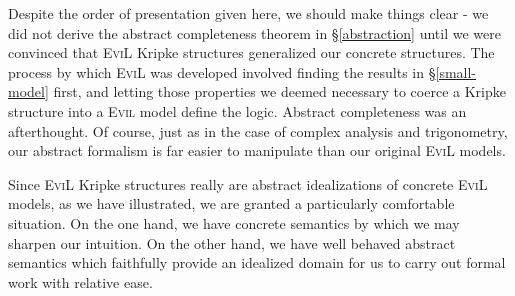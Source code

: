Despite the order of presentation given here, we should make things
clear - we did not derive the abstract completeness theorem in
\S\ref{abstraction} until we were convinced that \textsc{EviL} Kripke
structures generalized our concrete structures.  The process by which
\textsc{EviL} was developed involved finding the results in
\S\ref{small-model} first, and letting those properties we deemed 
necessary to coerce a Kripke structure into a \textsc{Evil} 
model define the logic.  
Abstract completeness was an afterthought.  Of course, just as in the
case of complex analysis and trigonometry, our abstract formalism
is far easier to manipulate than our original \textsc{EviL} models.

Since \textsc{EviL} Kripke structures really are abstract
idealizations of concrete \textsc{EviL} models, as we have
illustrated, we are granted a particularly comfortable situation.  
On the one hand, we have concrete semantics by
which we may sharpen our intuition. On the other hand, we 
have well behaved abstract semantics which faithfully provide an 
idealized domain for us to carry out formal work with relative ease.
